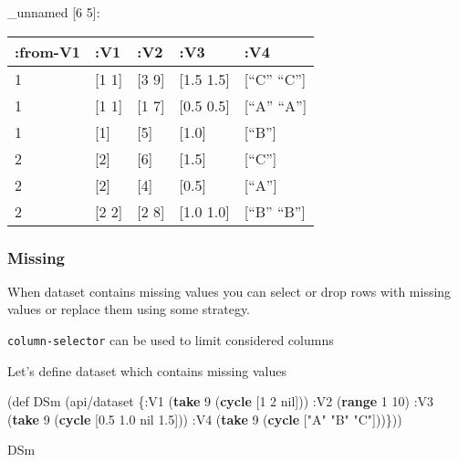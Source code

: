 \documentclass[]{article}
\newenvironment{Shaded}{\begin{snugshade}}{\end{snugshade}}
\newcommand{\KeywordTok}[1]{\textcolor[rgb]{0.13,0.29,0.53}{\textbf{#1}}}
\newcommand{\DecValTok}[1]{\textcolor[rgb]{0.00,0.00,0.81}{#1}}
\newcommand{\FloatTok}[1]{\textcolor[rgb]{0.00,0.00,0.81}{#1}}
\newcommand{\StringTok}[1]{\textcolor[rgb]{0.31,0.60,0.02}{#1}}
\newcommand{\FunctionTok}[1]{\textcolor[rgb]{0.00,0.00,0.00}{#1}}
\newcommand{\VariableTok}[1]{\textcolor[rgb]{0.00,0.00,0.00}{#1}}
\newcommand{\BuiltInTok}[1]{#1}
\newcommand{\AttributeTok}[1]{\textcolor[rgb]{0.77,0.63,0.00}{#1}}
\newcommand{\NormalTok}[1]{#1}
\begin{document}
\_unnamed {[}6 5{]}:

\begin{longtable}[]{@{}lllll@{}}
\toprule
:from-V1 & :V1 & :V2 & :V3 & :V4\tabularnewline
\midrule
\endhead
1 & {[}1 1{]} & {[}3 9{]} & {[}1.5 1.5{]} & {[}``C''
``C''{]}\tabularnewline
1 & {[}1 1{]} & {[}1 7{]} & {[}0.5 0.5{]} & {[}``A''
``A''{]}\tabularnewline
1 & {[}1{]} & {[}5{]} & {[}1.0{]} & {[}``B''{]}\tabularnewline
2 & {[}2{]} & {[}6{]} & {[}1.5{]} & {[}``C''{]}\tabularnewline
2 & {[}2{]} & {[}4{]} & {[}0.5{]} & {[}``A''{]}\tabularnewline
2 & {[}2 2{]} & {[}2 8{]} & {[}1.0 1.0{]} & {[}``B''
``B''{]}\tabularnewline
\bottomrule
\end{longtable}

\subsubsection{Missing}\label{missing}

When dataset contains missing values you can select or drop rows with
missing values or replace them using some strategy.

\texttt{column-selector} can be used to limit considered columns

Let's define dataset which contains missing values

\begin{Shaded}
\begin{Highlighting}[]
\NormalTok{(}\BuiltInTok{def}\FunctionTok{ DSm }\NormalTok{(api/dataset \{}\AttributeTok{:V1}\NormalTok{ (}\KeywordTok{take} \DecValTok{9}\NormalTok{ (}\KeywordTok{cycle}\NormalTok{ [}\DecValTok{1} \DecValTok{2} \VariableTok{nil}\NormalTok{]))}
                       \AttributeTok{:V2}\NormalTok{ (}\KeywordTok{range} \DecValTok{1} \DecValTok{10}\NormalTok{)}
                       \AttributeTok{:V3}\NormalTok{ (}\KeywordTok{take} \DecValTok{9}\NormalTok{ (}\KeywordTok{cycle}\NormalTok{ [}\FloatTok{0.5} \FloatTok{1.0} \VariableTok{nil} \FloatTok{1.5}\NormalTok{]))}
                       \AttributeTok{:V4}\NormalTok{ (}\KeywordTok{take} \DecValTok{9}\NormalTok{ (}\KeywordTok{cycle}\NormalTok{ [}\StringTok{"A"} \StringTok{"B"} \StringTok{"C"}\NormalTok{]))\}))}
\end{Highlighting}
\end{Shaded}

\begin{Shaded}
\begin{Highlighting}[]
\NormalTok{DSm}
\end{Highlighting}
\end{Shaded}
\end{document}
